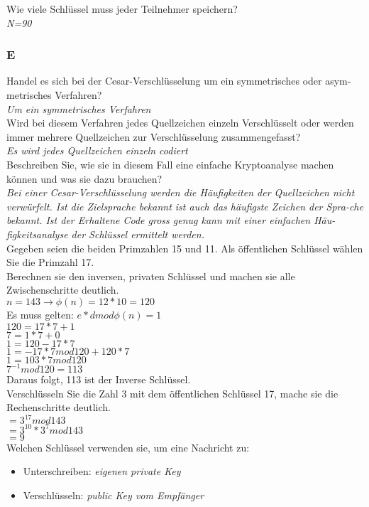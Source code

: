 Wie viele Schlüssel muss jeder Teilnehmer speichern?\\
\textit{N=90}\\

\subsubsection{E}
Handel es sich bei der Cesar-Verschlüsselung um ein symmetrisches oder asym-metrisches Verfahren?\\
\textit{Um ein symmetrisches Verfahren}\\

Wird bei diesem Verfahren jedes Quellzeichen einzeln Verschlüsselt oder werden immer mehrere Quellzeichen zur Verschlüsselung zusammengefasst?\\
\textit{Es wird jedes Quellzeichen einzeln codiert}\\

Beschreiben Sie, wie sie in diesem Fall eine einfache Kryptoanalyse machen können und was sie dazu brauchen?\\
\textit{Bei einer Cesar-Verschlüsselung werden die Häufigkeiten der Quellzeichen nicht verwürfelt. Ist die Zielsprache bekannt ist auch das häufigste Zeichen der Spra-che bekannt. Ist der Erhaltene Code gross genug kann mit einer einfachen Häu-figkeitsanalyse der Schlüssel ermittelt werden.}\\

Gegeben seien die beiden Primzahlen 15 und 11. Als öffentlichen Schlüssel wählen Sie die Primzahl 17.\\
Berechnen sie den inversen, privaten Schlüssel und machen sie alle Zwischenschritte deutlich.\\
$n = 143 \rightarrow \phi(n)=12*10=120$\\
Es muss gelten: $e*d mod \phi(n) = 1$\\
$120=17*7+1$\\
$7=1*7+0$\\

$1=120-17*7$\\
$1=-17*7mod120 + 120 * 7$\\
$1=103*7mod120$\\
$7^{-1}mod120=113$\\

Daraus folgt, 113 ist der Inverse Schlüssel.\\

Verschlüsseln Sie die Zahl 3 mit dem öffentlichen Schlüssel 17, mache sie die Rechenschritte deutlich.\\
$=3^{17}mod143$\\
$=3^{10}*3^7mod143$\\
$=9$\\

Welchen Schlüssel verwenden sie, um eine Nachricht zu:\\
\begin{itemize}
    \item Unterschreiben: \textit{eigenen private Key}
    \item Verschlüsseln: \textit{public Key vom Empfänger}
\end{itemize}
